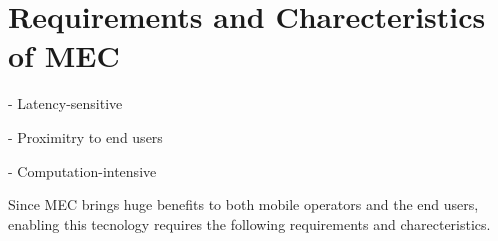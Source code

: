 \section{Requirements and Charecteristics of MEC}  \label{requirements}

- Latency-sensitive

- Proximitry to end users

- Computation-intensive

Since MEC brings huge benefits to both mobile operators and the end users, enabling this tecnology requires the following requirements and charecteristics.

